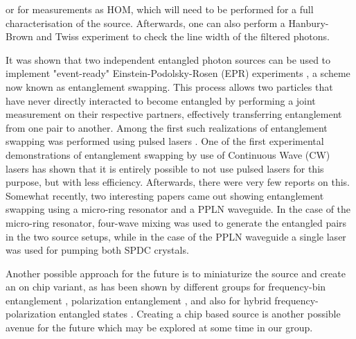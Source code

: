 \documentclass{article}
\begin{document}
or for measurements as HOM, which will need to be performed for a full characterisation of the source.
Afterwards, one can also perform a Hanbury-Brown and Twiss \cite{Brown_Twiss_1954} experiment to check the line width of the filtered photons.
\par It was shown \cite{Zukowski_1993} that two independent entangled photon sources can be used to implement
"event-ready" Einstein-Podolsky-Rosen (EPR) experiments \cite{EPR1935}, a scheme now known as entanglement swapping.
This process allows two particles that have never directly interacted to become entangled by performing a
joint measurement on their respective partners, effectively transferring entanglement from one pair to another.
Among the first such realizations of entanglement swapping was performed using pulsed lasers \cite{Kaltenbaek_2006}.
One of the first \cite{Halder_Beveratos_Jorel_Zbinden_Simon_Scarani_Gisin_2007} experimental demonstrations of entanglement
swapping by use of Continuous Wave (CW) lasers has shown that it is entirely possible to not use pulsed lasers for this purpose, but with less efficiency.
Afterwards, there were very few reports
on this. Somewhat recently, two \cite{Samara_Maring_Martin_Raja_Kippenberg_Zbinden_Thew_2021,Tsujimoto_Tanaka_Iwasaki_Ikuta_Miki_Yamashita_Terai_Yamamoto_Koashi_Imoto_2018}
interesting papers came out showing entanglement swapping using a micro-ring resonator and a PPLN waveguide. In the case of the micro-ring resonator, four-wave mixing
was used to generate the entangled pairs in the two source setups, while in the case of the PPLN waveguide a single laser was used for pumping both SPDC crystals.

\par Another possible approach for the future is to miniaturize the source and create
an on chip variant, as has been shown by different groups for frequency-bin entanglement \cite{S_G_S_C_F_B_L_G_B_2022},
polarization entanglement \cite{L_Z_F_F_L_L_W_R_D_X_etal._2017}, and also for hybrid frequency-polarization
entangled states \cite{F_R_D_F_L_M_A_B_D_2023}.
Creating a chip based source is another possible avenue for the future which may be explored at some time in our group.
\end{document}
